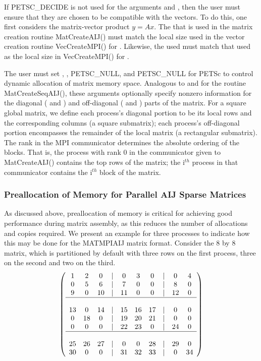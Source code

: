 If PETSC\_DECIDE is not used for the arguments
 and , then the user must ensure that they are chosen to be
compatible with the vectors. To do this, one first considers the matrix-vector product
$y = A x$. The  that is used in the matrix creation routine MatCreateAIJ()
must match the local size used in the vector creation routine VecCreateMPI() for .
Likewise, the  used must match that used as the local size in
VecCreateMPI() for .

The user must set , , PETSC\_NULL, and
PETSC\_NULL for PETSc to control dynamic allocation of matrix
memory space.  Analogous to  and  for the routine
MatCreateSeqAIJ(), these arguments optionally specify
nonzero information for the diagonal ( and ) and
off-diagonal ( and ) parts of the matrix.
For a square global matrix, we define each process's diagonal portion
to be its local rows and the corresponding columns (a square submatrix);
each process's off-diagonal portion encompasses the remainder of the
local matrix (a rectangular submatrix).
The rank in the MPI communicator determines the absolute ordering of the
blocks.  That is, the process with rank 0 in the communicator given to  MatCreateAIJ() contains the top rows of the matrix; the i$^{th}$ process
in that communicator contains the i$^{th}$ block of the matrix.

\subsubsection{Preallocation of Memory for Parallel AIJ Sparse Matrices}

As discussed above, preallocation of memory is critical for achieving good
performance during matrix assembly, as this reduces the number of
allocations and copies required.  We present an example for
three processes to indicate how this may be done for the MATMPIAIJ
matrix format.  Consider the 8 by
8 matrix, which is partitioned by default with three rows on the first
process, three on the second and two on the third.  {\small
\[
\left( \begin{array}{cccccccccc}
1  & 2  & 0  & | & 0  & 3  & 0  & |  & 0  & 4  \\
0  & 5  & 6  & | & 7  & 0  & 0  & |  & 8  & 0 \\
9  & 0  & 10 & | & 11 & 0  & 0  & |  & 12 & 0  \\
\hline \\
13 & 0  & 14 & | & 15 & 16 & 17 & |  & 0  & 0  \\
0  & 18 & 0  & | & 19 & 20 & 21 & |  & 0  & 0 \\
0  & 0  & 0  & | & 22 & 23 & 0  & |  & 24 & 0 \\
\hline \\
25 & 26 & 27 & | & 0  & 0  & 28 & |  & 29 & 0 \\
30 & 0  & 0  & | & 31 & 32 & 33 & |  & 0  &34
\end{array} \right)
\]
}

